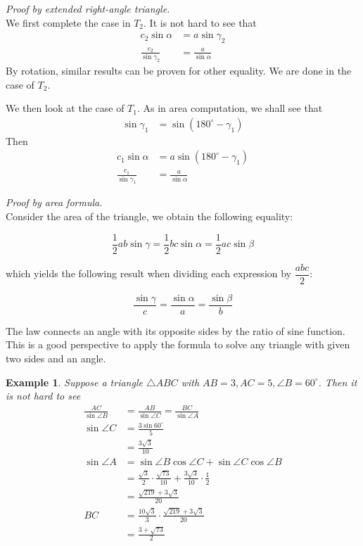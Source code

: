 \documentclass[12pt]{article}
\newtheorem*{example}{Example}
\renewenvironment{proof}[1][Proof]{\begin{snugshade*} \textit{{#1}.}\\}{\hfill \qedsymbol \end{snugshade*}}
\begin{document}
    \begin{proof}[Proof by extended right-angle triangle]
        We first complete the case in $T_2$. It is not hard to see that \begin{align*}
            c_2\sin{\alpha}&=a\sin{\gamma_2}\\
            \frac{c_2}{\sin{\gamma_2}}&=\frac{a}{\sin{\alpha}}
        \end{align*}
        By rotation, similar results can be proven for other equality. We are done in the case of $T_2$.

        We then look at the case of $T_1$. As in area computation, we shall see that \begin{align*}
            \sin{\gamma_1}&=\sin(180^\circ - \gamma_1)
        \end{align*}
        Then \begin{align*}
            c_1\sin{\alpha}&=a\sin(180^\circ - \gamma_1)\\
            \frac{c_1}{\sin{\gamma_1}}&=\frac{a}{\sin{\alpha}}
        \end{align*}
    \end{proof}

    \begin{proof}[Proof by area formula]
        Consider the area of the triangle, we obtain the following equality:

        $$\frac{1}{2}ab\sin{\gamma}=\frac{1}{2}bc\sin{\alpha}=\frac{1}{2}ac\sin{\beta}$$

        which yields the following result when dividing each expression by $\dfrac{abc}{2}$:

        $$\frac{\sin{\gamma}}{c}=\frac{\sin{\alpha}}{a}=\frac{\sin{\beta}}{b}$$
    \end{proof}

    The law connects an angle with its opposite sides by the ratio of sine function. This is a good perspective to apply the formula to solve any triangle with given two sides and an angle.

    \begin{example}
        Suppose a triangle $\triangle ABC$ with $AB=3, AC=5, \angle B = 60^\circ$. Then it is not hard to see \begin{align*}
            \frac{AC}{\sin{\angle B}}&=\frac{AB}{\sin{\angle C}}=\frac{BC}{\sin{\angle A}}\\
            \sin{\angle C}&=\frac{3\sin{60^\circ}}{5}\\
            &=\frac{3\sqrt{3}}{10}\\
            \sin{\angle A}&=\sin{\angle B}\cos{\angle C}+\sin{\angle C}\cos{\angle B}\\
            &=\frac{\sqrt{3}}{2}\cdot \frac{\sqrt{73}}{10}+\frac{3\sqrt{3}}{10}\cdot \frac{1}{2}\\
            &=\frac{\sqrt{219}+3\sqrt{3}}{20}\\
            BC&=\frac{10\sqrt{3}}{3}\cdot\frac{\sqrt{219}+3\sqrt{3}}{20}\\
            &=\frac{3+\sqrt{73}}{2}
        \end{align*}
    \end{example}
\end{document}
